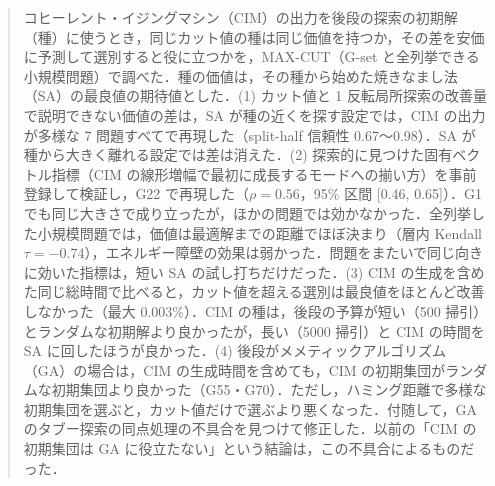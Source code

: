 \begin{abstract}
コヒーレント・イジングマシン（CIM）の出力を後段の探索の初期解（種）に使うとき，同じカット値の種は同じ価値を持つか，その差を安価に予測して選別すると役に立つかを，MAX-CUT（G-set と全列挙できる小規模問題）で調べた．種の価値は，その種から始めた焼きなまし法（SA）の最良値の期待値とした．(1) カット値と 1 反転局所探索の改善量で説明できない価値の差は，SA が種の近くを探す設定では，CIM の出力が多様な 7 問題すべてで再現した（split-half 信頼性 0.67〜0.98）．SA が種から大きく離れる設定では差は消えた．(2) 探索的に見つけた固有ベクトル指標（CIM の線形増幅で最初に成長するモードへの揃い方）を事前登録して検証し，G22 で再現した（$\rho=0.56$，95\% 区間 [0.46, 0.65]）．G1 でも同じ大きさで成り立ったが，ほかの問題では効かなかった．全列挙した小規模問題では，価値は最適解までの距離でほぼ決まり（層内 Kendall $\tau=-0.74$），エネルギー障壁の効果は弱かった．問題をまたいで同じ向きに効いた指標は，短い SA の試し打ちだけだった．(3) CIM の生成を含めた同じ総時間で比べると，カット値を超える選別は最良値をほとんど改善しなかった（最大 0.003\%）．CIM の種は，後段の予算が短い（500 掃引）とランダムな初期解より良かったが，長い（5000 掃引）と CIM の時間を SA に回したほうが良かった．(4) 後段がメメティックアルゴリズム（GA）の場合は，CIM の生成時間を含めても，CIM の初期集団がランダムな初期集団より良かった（G55・G70）．ただし，ハミング距離で多様な初期集団を選ぶと，カット値だけで選ぶより悪くなった．付随して，GA のタブー探索の同点処理の不具合を見つけて修正した．以前の「CIM の初期集団は GA に役立たない」という結論は，この不具合によるものだった．
\end{abstract}
